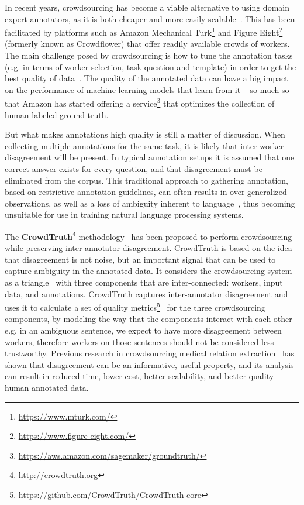 In recent years, crowdsourcing has become a viable alternative to using domain expert annotators, as it is both cheaper and more easily scalable~\cite{Sabou:2012:CRO:2362456.2362479}. This has been facilitated by platforms such as Amazon Mechanical Turk\footnote{\url{https://www.mturk.com/}} and Figure Eight\footnote{\url{https://www.figure-eight.com/}} (formerly known as Crowdflower) that offer readily available crowds of workers. The main challenge posed by crowdsourcing is how to tune the annotation tasks (e.g. in terms of worker selection, task question and template) in order to get the best quality of data~\cite{Difallah2012}. The quality of the annotated data can have a big impact on the performance of machine learning models that learn from it -- so much so that Amazon has started offering a service\footnote{\url{https://aws.amazon.com/sagemaker/groundtruth/}} that optimizes the collection of human-labeled ground truth.

But what makes annotations high quality is still a matter of discussion. When collecting multiple annotations for the same task, it is likely that inter-worker disagreement will be present. In typical annotation setups it is assumed that one correct answer exists for every question, and that disagreement must be eliminated from the corpus. This traditional approach to gathering annotation, based on restrictive annotation guidelines, can often results in over-generalized observations, as well as a loss of ambiguity inherent to language~\cite{aroyo2012harnessing}, thus becoming unsuitable for use in training natural language processing systems. %

The \textbf{CrowdTruth}\footnote{\url{http://crowdtruth.org}} methodology~\cite{aroyo2015truth,aroyo2013crowd} has been proposed to perform crowdsourcing while preserving inter-annotator disagreement. CrowdTruth is based on the idea~\cite{aroyo2015truth} that disagreement is not noise, but an important signal that can be used to capture ambiguity in the annotated data. It considers the crowdsourcing system as a triangle~\cite{aroyo2014threesides} with three components that are inter-connected: workers, input data, and annotations. CrowdTruth captures inter-annotator disagreement and uses it to calculate a set of quality metrics\footnote{\url{https://github.com/CrowdTruth/CrowdTruth-core}}~\cite{inel2013,dumitrache2018crowdtruth} for the three crowdsourcing components, by modeling the way that the components interact with each other -- e.g. in an ambiguous sentence, we expect to have more disagreement between workers, therefore workers on those sentences should not be considered less trustworthy. Previous research in crowdsourcing medical relation extraction~\cite{aroyo2013crowd,aroyo2013measuring} has shown that disagreement can be an informative, useful property, and its analysis can result in reduced time, lower cost, better scalability, and better quality human-annotated data.

